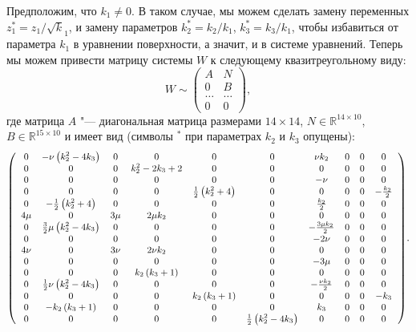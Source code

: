 \documentclass[../main.tex]{subfiles}
\begin{document}
Предположим, что $k_1 \ne 0$. В таком случае, мы можем сделать замену переменных $z^*_1 = z_1
/ \sqrt k_1$, и замену параметров $k^*_2 = k_2 / k_1$, $k^*_3 = k_3 / k_1$, чтобы избавиться от параметра $k_1$ в уравнении поверхности, а значит, и в системе уравнений. Теперь мы можем привести матрицу системы $W$ к следующему квазитреугольному виду:
\begin{equation*}
W \sim
\begin{pmatrix}
A & N \\
0 & B \\
\hdots & \hdots  \\
0 & 0
\end{pmatrix},
\end{equation*}
где матрица $A$ "--- диагональная матрица размерами $14\times14$, $N\in \mathbb{R}^{14\times10}$, $B \in \mathbb{R}^{15\times10}$ и имеет вид (символы ${}^*$ при параметрах $k_2$ и $k_3$ опущены):
\begin{equation}\label{eq:aux_matrix}
{\small\left(
\begin{array}{cccccccccc}
 0 & -\nu  \left(k_2^2-4 k_3\right) & 0 & 0 & 0 & 0 & \nu  k_2 & 0 & 0 & 0 \\
 0 & 0 & 0 & k_2^2-2 k_3+2 & 0 & 0 & 0 & 0 & 0 & 0 \\
 0 & 0 & 0 & 0 & 0 & 0 & -\nu  & 0 & 0 & 0 \\
 0 & 0 & 0 & 0 & \frac{1}{2} \left(k_2^2+4\right) & 0 & 0 & 0 & 0 & -\frac{k_2}{2} \\
 0 & -\frac{1}{2} \left(k_2^2+4\right) & 0 & 0 & 0 & 0 & \frac{k_2}{2} & 0 & 0 & 0 \\
 4 \mu  & 0 & 3 \mu  & 2 \mu  k_2 & 0 & 0 & 0 & 0 & 0 & 0 \\
 0 & \frac{3}{2} \mu  \left(k_2^2-4 k_3\right) & 0 & 0 & 0 & 0 & -\frac{3 \mu  k_2}{2} & 0 & 0 & 0 \\
 0 & 0 & 0 & 0 & 0 & 0 & -2 \nu  & 0 & 0 & 0 \\
 4 \nu  & 0 & 3 \nu  & 2 \nu  k_2 & 0 & 0 & 0 & 0 & 0 & 0 \\
 0 & 0 & 0 & 0 & 0 & 0 & -3 \mu  & 0 & 0 & 0 \\
 0 & 0 & 0 & k_2 \left(k_3+1\right) & 0 & 0 & 0 & 0 & 0 & 0 \\
 0 & \frac{1}{2} \nu  \left(k_2^2-4 k_3\right) & 0 & 0 & 0 & 0 & -\frac{\nu  k_2}{2} & 0 & 0 & 0 \\
 0 & 0 & 0 & 0 & k_2 \left(k_3+1\right) & 0 & 0 & 0 & 0 & -k_3 \\
 0 & -k_2 \left(k_3+1\right) & 0 & 0 & 0 & 0 & k_3 & 0 & 0 & 0 \\
 0 & 0 & 0 & 0 & 0 & \frac{1}{2} \left(k_2^2-4 k_3\right) & 0 & 0 & 0 & 0 \\
\end{array}
\right)}.
\end{equation}
\end{document}
